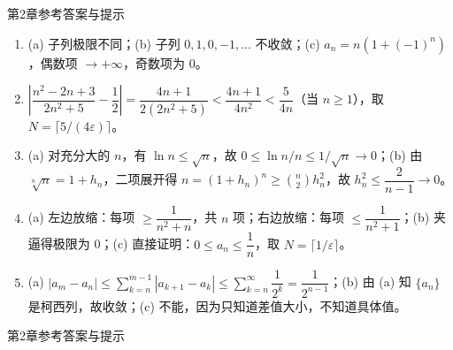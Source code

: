 \documentclass[aspectratio=169,10pt,fontset=fandol]{ctexbeamer}
\begin{document}
\begin{frame}[t,fragile]{第2章参考答案与提示}
{\begin{enumerate}
\[   \]

   因而 \(0\leq n^c/a^n\leq Cn^{c-m}\to0\)。



\item[(7)] 

   (a) 子列极限不同；(b) 子列 \(0,1,0,-1,\dots\) 不收敛；(c) \(a_n = n(1+(-1)^n)\)，偶数项 \(\to +\infty\)，奇数项为 0。



\item[(8)] 

   \(\left|\dfrac{n^2-2n+3}{2n^2+5} - \dfrac{1}{2}\right| = \dfrac{4n+1}{2(2n^2+5)} < \dfrac{4n+1}{4n^2} < \dfrac{5}{4n}\)（当 \(n \geq 1\)），取 \(N = \lceil 5/(4\varepsilon) \rceil\)。



\item[(9)] 

   (a) 对充分大的 \(n\)，有 \(\ln n\leq\sqrt n\)，故 \(0\leq \ln n/n\leq1/\sqrt n\to0\)；(b) 由 \(\sqrt[n]{n}=1+h_n\)，二项展开得 \(n=(1+h_n)^n\geq\binom{n}{2}h_n^2\)，故 \(h_n^2\leq\dfrac{2}{n-1}\to0\)。



\item[(10)] 

   (a) 左边放缩：每项 \(\geq \dfrac{1}{n^2+n}\)，共 \(n\) 项；右边放缩：每项 \(\leq \dfrac{1}{n^2+1}\)；(b) 夹逼得极限为 0；(c) 直接证明：\(0 \leq a_n \leq \dfrac{1}{n}\)，取 \(N = \lceil 1/\varepsilon \rceil\)。



\item[(11)] 

   (a) \(|a_m - a_n| \leq \sum_{k=n}^{m-1} |a_{k+1}-a_k| \leq \sum_{k=n}^{\infty} \dfrac{1}{2^k} = \dfrac{1}{2^{n-1}}\)；(b) 由 (a) 知 \(\{a_n\}\) 是柯西列，故收敛；(c) 不能，因为只知道差值大小，不知道具体值。

\end{enumerate}
}
\end{frame}
\begin{frame}[t,fragile]{第2章参考答案与提示}
\normalsize
{\normalsize


\fi



\clearpage




}
\end{frame}
\end{document}
